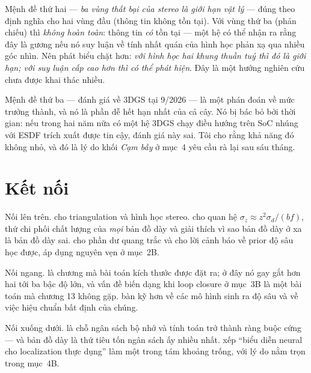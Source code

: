 \documentclass[../../vslam.tex]{subfiles}
\begin{document}
Mệnh đề thứ hai --- \emph{ba vùng thất bại của stereo là giới hạn vật lý} --- đúng theo định nghĩa cho hai vùng đầu (thông tin không tồn tại). Với vùng thứ ba (phản chiếu) thì \emph{không hoàn toàn}: thông tin \emph{có} tồn tại --- một hệ có thể nhận ra rằng đây là gương nếu nó suy luận về tính nhất quán của hình học phản xạ qua nhiều góc nhìn. Nên phát biểu chặt hơn: \emph{với hình học hai khung thuần tuý thì đó là giới hạn; với suy luận cấp cao hơn thì có thể phát hiện}. Đây là một hướng nghiên cứu chưa được khai thác nhiều.

Mệnh đề thứ ba --- đánh giá về 3DGS tại 9/2026 --- là một phán đoán về mức trưởng thành, và nó là phần dễ hết hạn nhất của cả cây. Nó bị bác bỏ bởi thời gian: nếu trong hai năm nữa có một hệ 3DGS chạy điều hướng trên SoC nhúng với ESDF trích xuất được tin cậy, đánh giá này sai. Tôi cho rằng khả năng đó không nhỏ, và đó là lý do khối \emph{Cạm bẫy} ở mục~4 yêu cầu rà lại sau sáu tháng.

\section{Kết nối}

Nối lên trên.  cho triangulation và hình học stereo.  cho quan hệ \(\sigma_z \approx z^2\sigma_d/(bf)\), thứ chi phối chất lượng của \emph{mọi} bản đồ dày và giải thích vì sao bản đồ dày ở xa là bản đồ dày sai.  cho phần dư quang trắc và cho lời cảnh báo về prior độ sâu học được, áp dụng nguyên vẹn ở mục~2B.

Nối ngang.  là chương mà bài toán kích thước được đặt ra; ở đây nó gay gắt hơn hai tới ba bậc độ lớn, và vấn đề biến dạng khi loop closure ở mục~3B là một bài toán mà chương 13 không gặp.  bàn kỹ hơn về các mô hình sinh ra độ sâu và về việc hiệu chuẩn bất định của chúng.

Nối xuống dưới.  là chỗ ngân sách bộ nhớ và tính toán trở thành ràng buộc cứng --- và bản đồ dày là thứ tiêu tốn ngân sách ấy nhiều nhất.  xếp ``biểu diễn neural cho localization thực dụng'' làm một trong tám khoảng trống, với lý do nằm trọn trong mục~4B.
\end{document}
